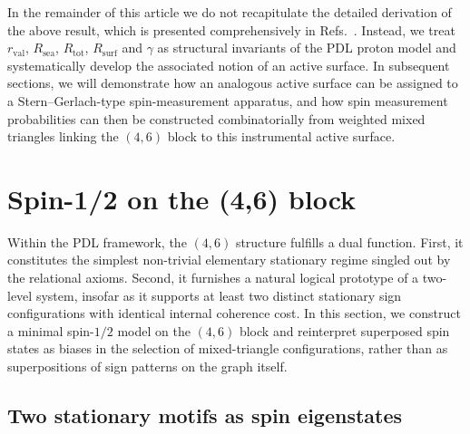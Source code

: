 \documentclass[11pt,a4paper]{article}
\numberwithin{equation}{section}
\begin{document}
In the remainder of this article we do not recapitulate the detailed derivation of the above result, which is presented comprehensively in Refs.~\cite{LaubscherDerivationAlpha2026,LaubscherGoldenRatioPDL2026}. Instead, we treat $r_{\mathrm{val}}$, $R_{\mathrm{sea}}$, $R_{\mathrm{tot}}$, $R_{\mathrm{surf}}$ and $\gamma$ as structural invariants of the PDL proton model and systematically develop the associated notion of an active surface. In subsequent sections, we will demonstrate how an analogous active surface can be assigned to a Stern–Gerlach-type spin-measurement apparatus, and how spin measurement probabilities can then be constructed combinatorially from weighted mixed triangles linking the $(4,6)$ block to this instrumental active surface.

\section{Spin-1/2 on the (4,6) block}
\label{sec:spin_on_46}

Within the PDL framework, the $(4,6)$ structure fulfills a dual function. First, it constitutes the simplest non-trivial elementary stationary regime singled out by the relational axioms. Second, it furnishes a natural logical prototype of a two-level system, insofar as it supports at least two distinct stationary sign configurations with identical internal coherence cost. In this section, we construct a minimal spin-$1/2$ model on the $(4,6)$ block and reinterpret superposed spin states as biases in the selection of mixed-triangle configurations, rather than as superpositions of sign patterns on the graph itself.

\subsection{Two stationary motifs as spin eigenstates}
\end{document}
